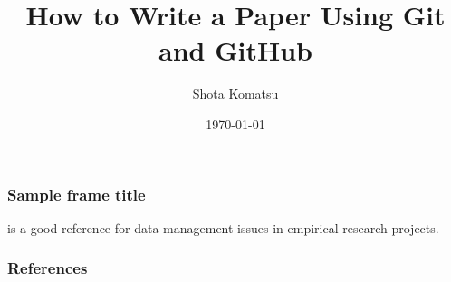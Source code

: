 \documentclass{beamer}
\title{How to Write a Paper Using Git and GitHub}
\author{Shota Komatsu}
\date{\today}
\begin{document}
\frame{\titlepage}

\begin{frame}
\frametitle{Sample frame title}
\citet{knittel2018working} is a good reference for data management issues in empirical research projects.
\end{frame}

\begin{frame}
\frametitle{References}


    

\end{frame}
\end{document}
